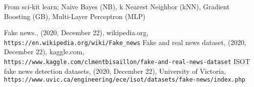 \documentclass[a4paper]{article}
\begin{document}
From sci-kit learn; Naive Bayes (NB), k Nearest Neighbor (kNN), Gradient Boosting (GB), Multi-Layer Perceptron (MLP)

\begin{thebibliography}{9}
 Fake news., (2020, December 22), wikipedia.org, \\\texttt{https://en.wikipedia.org/wiki/Fake\_news}
 Fake and real news dataset, (2020, December 22), kaggle.com, \\\texttt{https://www.kaggle.com/clmentbisaillon/fake-and-real-news-dataset}
 ISOT fake news detection datasets, (2020, December 22), University of Victoria, \\\texttt{https://www.uvic.ca/engineering/ece/isot/datasets/fake-news/index.php}
\end{thebibliography}
\end{document}
